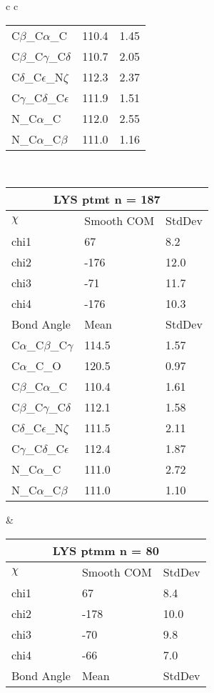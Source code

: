 \begin{longtable}{ c c }
\begin{tabular}{ l l l }
  C$\beta$\_C$\alpha$\_C & 110.4 & 1.45\\
  C$\beta$\_C$\gamma$\_C$\delta$ & 110.7 & 2.05\\
  C$\delta$\_C$\epsilon$\_N$\zeta$ & 112.3 & 2.37\\
  C$\gamma$\_C$\delta$\_C$\epsilon$ & 111.9 & 1.51\\
  N\_C$\alpha$\_C & 112.0 & 2.55\\
  N\_C$\alpha$\_C$\beta$ & 111.0 & 1.16\\
  \bottomrule
  \end{tabular}
  \\
  \begin{tabular}{ l l l }
  \toprule
  \multicolumn{3}{c}{LYS \textbf{ptmt} n = 187} \\ \toprule
  $\chi$       & Smooth COM & StdDev \\ \midrule
  chi1 & 67 & 8.2 \\ 
  chi2 & -176 & 12.0 \\ 
  chi3 & -71 & 11.7 \\ 
  chi4 & -176 & 10.3 \\ \midrule
  Bond Angle   & Mean     & StdDev \\ \midrule
  C$\alpha$\_C$\beta$\_C$\gamma$ & 114.5 & 1.57\\
  C$\alpha$\_C\_O & 120.5 & 0.97\\
  C$\beta$\_C$\alpha$\_C & 110.4 & 1.61\\
  C$\beta$\_C$\gamma$\_C$\delta$ & 112.1 & 1.58\\
  C$\delta$\_C$\epsilon$\_N$\zeta$ & 111.5 & 2.11\\
  C$\gamma$\_C$\delta$\_C$\epsilon$ & 112.4 & 1.87\\
  N\_C$\alpha$\_C & 111.0 & 2.72\\
  N\_C$\alpha$\_C$\beta$ & 111.0 & 1.10\\
  \bottomrule
  \end{tabular}
  &
  \begin{tabular}{ l l l }
  \toprule
  \multicolumn{3}{c}{LYS \textbf{ptmm} n = 80} \\ \toprule
  $\chi$       & Smooth COM & StdDev \\ \midrule
  chi1 & 67 & 8.4 \\ 
  chi2 & -178 & 10.0 \\ 
  chi3 & -70 & 9.8 \\ 
  chi4 & -66 & 7.0 \\ \midrule
  Bond Angle   & Mean     & StdDev \\ \midrule

\end{tabular}
\end{longtable}
